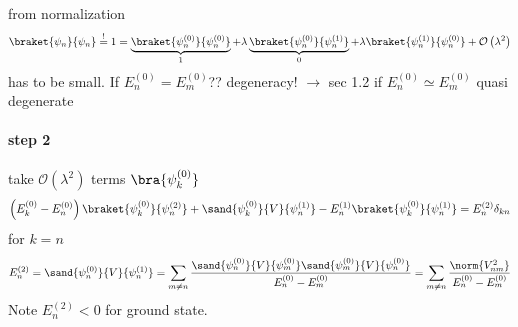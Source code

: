 from normalization
\begin{dmath}[]
	\braket{\psi_n}{\psi_n}\stackrel{!}{=}1=\underbrace{\braket{\psi_{n}^{(0)}}{\psi_{n}^{(0)}}}_{1}+\lambda\underbrace{\braket{\psi_{n}^{(0)}}{\psi_{n}^{(1)}}}_{0}+\lambda\braket{\psi_{n}^{(1)}}{\psi_{n}^{(0)}}+\mathcal{O}\left( \lambda^2 \right)
\end{dmath}
has to be small. If $E_{n}^{(0)}=E_{m}^{(0)}$?? degeneracy! $\to$ sec 1.2 if $E_{n}^{(0)}\simeq E_{m}^{(0)}$ quasi degenerate 

\paragraph{step 2}
take $\mathcal{O}(\lambda^2)$ terms $\bra{\psi_{k}^{(0)}}$
\begin{dmath}[]
	\left( E_{k}^{(0)}-E_{n}^{(0)} \right)\braket{\psi_{k}^{(0)}}{\psi_{n}^{(2)}} + \sand{\psi_{k}^{(0)}}{V}{\psi_{n}^{(1)}}-E_{n}^{(1)}\braket{\psi_{k}^{(0)}}{\psi_{n}^{(1)}}=E_{n}^{(2)}\delta_{kn}
\end{dmath}
for $k=n$
\begin{dmath}[]
	E_{n}^{(2)}=\sand{\psi_{n}^{(0)}}{V}{\psi_{n}^{(1)}}=\sum_{m\neq n}^{}\frac{\sand{\psi_{n}^{(0)}}{V}{\psi_{m}^{(0)}}\sand{\psi_{m}^{(0)}}{V}{\psi_{n}^{(0)}}}{E_{n}^{(0)}-E_{m}^{(0)}}=\sum_{m\neq n}^{}\frac{\norm{V_{nm}^2}}{E_{n}^{(0)}-E_{m}^{(0)}}
\end{dmath}
Note $E_{n}^{(2)}<0$ for ground state.

